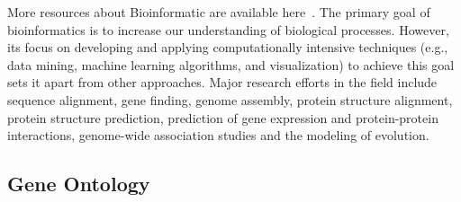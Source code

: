 More resources about Bioinformatic are available here~\cite{Bioinformatic_resources}.
The primary goal of bioinformatics is to increase our understanding of biological processes.
However, its focus on developing and applying computationally intensive techniques (e.g., data mining, machine learning algorithms, and visualization) to achieve this goal sets it apart from other approaches.
Major research efforts in the field include sequence alignment, gene finding, genome assembly, protein structure alignment, protein structure prediction, prediction of gene expression and protein-protein interactions, genome-wide association studies and the modeling of evolution.

\subsection{Gene Ontology}
\label{sec:gene_ontology}

